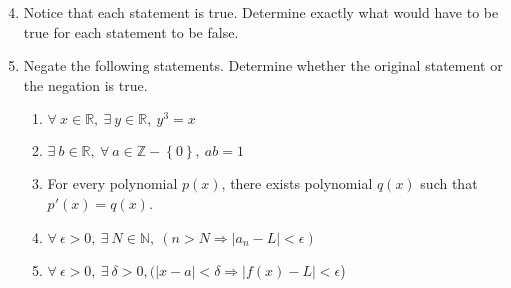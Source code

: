 \documentclass[12 pt]{article}
\newcommand{\R}{\mathbb{R}}
\newcommand{\Z}{\mathbb{Z}}
\newcommand{\N}{\mathbb{N}}
\newcommand{\set}[1]{\left\{#1\right\}}
\theoremstyle{definition}
\theoremstyle{plain}
\theoremstyle{mytheorem}
\theoremstyle{myexample}
\theoremstyle{mydefinition}
\begin{document}
\begin{enumerate}
\setcounter{enumi}{3}
\item Notice that each statement is true.  Determine exactly what would have to be true for each statement to be false.
	\vspace{4in}



\item Negate the following statements.  Determine whether the original statement or the negation is true.
	\begin{enumerate} \itemsep1in
	\item $\forall \ x \in \R, \ \exists \ y \in \R, \ y^3=x$
	\item $\exists \ b \in \R, \ \forall \ a \in \Z-\set{0}, \ ab=1$
	\item For every polynomial $p(x)$, there exists polynomial $q(x)$ such that $p'(x)=q(x)$.
	\item $\forall \ \epsilon >0, \ \exists \ N \in \N, \ (n > N \Rightarrow |a_n - L| < \epsilon)$
	\item $\forall \ \epsilon >0, \ \exists \ \delta > 0, (|x-a|<\delta \Rightarrow |f(x)-L| < \epsilon$)
	\end{enumerate}
	

\end{enumerate}
\end{document}
